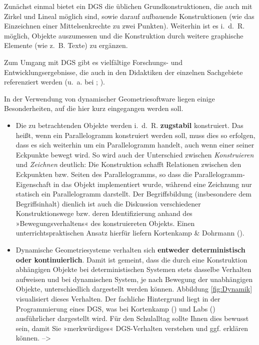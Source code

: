 \documentclass[
]{scrbook}
\providecommand{\tightlist}{%
  \setlength{\itemsep}{0pt}\setlength{\parskip}{0pt}}
\theoremstyle{definition}
\theoremstyle{definition}
\theoremstyle{definition}
\theoremstyle{definition}
\theoremstyle{remark}
\begin{document}
Zunächst einmal bietet ein DGS die üblichen Grundkonstruktionen, die auch mit Zirkel und Lineal möglich sind, sowie darauf aufbauende Konstruktionen (wie das Einzeichnen einer Mittelsenkrechte zu zwei Punkten). Weiterhin ist es i.~d.~R. möglich, Objekte auszumessen und die Konstruktion durch weitere graphische Elemente (wie z.~B. Texte) zu ergänzen.

Zum Umgang mit DGS gibt es vielfältige Forschungs- und Entwicklungsergebnisse, die auch in den Didaktiken der einzelnen Sachgebiete referenziert werden (u.~a. bei ; ).

In der Verwendung von dynamischer Geometriesoftware liegen einige Besonderheiten, auf die hier kurz eingegangen werden soll.

\begin{itemize}
\tightlist
\item
  Die zu betrachtenden Objekte werden i.~d.~R. \textbf{zugstabil} konstruiert. Das heißt, wenn ein Parallelogramm konstruiert werden soll, muss dies so erfolgen, dass es sich weiterhin um ein Parallelogramm handelt, auch wenn einer seiner Eckpunkte bewegt wird. So wird auch der Unterschied zwischen \emph{Konstruieren} und \emph{Zeichnen} deutlich: Die Konstruktion schafft Relationen zwischen den Eckpunkten bzw. Seiten des Parallelogramms, so dass die Parallelogramm-Eigenschaft in das Objekt implementiert wurde, während eine Zeichnung nur statisch ein Parallelogramm darstellt. Der Begriffsbildung (insbesondere dem Begriffsinhalt) dienlich ist auch die Diskussion verschiedener Konstruktionswege bzw. deren Identifizierung anhand des »Bewegungsverhaltens« des konstruiereten Objekts. Einen unterrichtspraktischen Ansatz hierfür liefern Kortenkamp \& Dohrmann ().
\end{itemize}

\begin{itemize}
\tightlist
\item
  Dynamische Geometriesysteme verhalten sich \textbf{entweder deterministisch oder kontinuierlich}. Damit ist gemeint, dass die durch eine Konstruktion abhängigen Objekte bei deterministischen Systemen stets dasselbe Verhalten aufweisen und bei dynamischen System, je nach Bewegung der unabhängigen Objekte, unterschiedlich dargestellt werden können. Abbildung \ref{fig:Dynamik} visualisiert dieses Verhalten. Der fachliche Hintergrund liegt in der Programmierung eines DGS, was bei Kortenkamp () und Labs () ausführlicher dargestellt wird. Für den Schulalltag sollte Ihnen dies bewusst sein, damit Sie »merkwürdiges« DGS-Verhalten verstehen und ggf. erklären können.
  --\textgreater{}
\end{itemize}
\end{document}
